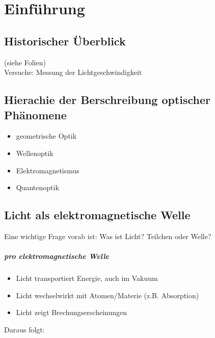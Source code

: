 
\chapter{Einführung}


\section{Historischer Überblick}
(siehe Folien)\\
Versuche: Messung der Lichtgeschwindigkeit

\section{Hierachie der Berschreibung optischer Phänomene}
\begin{itemize}
	\item geometrische Optik
	\item Wellenoptik
	\item Elektromagnetismus
	\item Quantenoptik
\end{itemize}

\section{Licht als elektromagnetische Welle}
Eine wichtige Frage vorab ist:
Was ist Licht? Teilchen oder Welle?

\paragraph{pro elektromagnetische Welle}
\begin{itemize}
	\item Licht transportiert Energie, auch im Vakuum
	\item Licht wechselwirkt mit Atomen/Materie (z.B. 		Absorption)
	\item Licht zeigt Brechungserscheinungen
\end{itemize}
Daraus folgt: 

